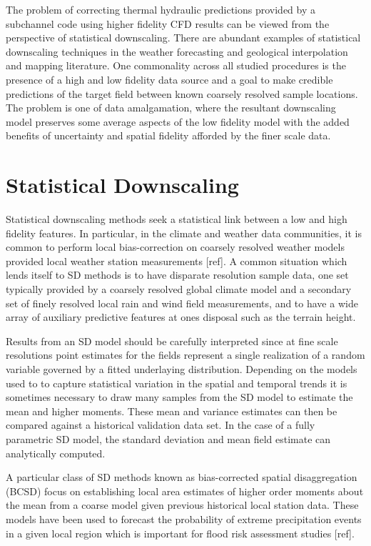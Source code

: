 
The problem of correcting thermal hydraulic predictions provided by a subchannel code using higher fidelity CFD results can be viewed from the perspective of statistical downscaling.  There are abundant examples of statistical downscaling techniques in the weather forecasting and geological interpolation and mapping literature.  One commonality across all studied procedures is the presence of a high and low fidelity data source and a goal to make credible predictions of the target field between known coarsely resolved sample locations.  The problem is one of data amalgamation, where the resultant downscaling model preserves some average aspects of the low fidelity model with the added benefits of uncertainty and spatial fidelity afforded by the finer scale data.

\section{Statistical Downscaling}

Statistical downscaling methods seek a statistical link between a low and high fidelity features. 
In particular, in the climate and weather data communities, it is common to perform local bias-correction on coarsely resolved weather models provided local weather station measurements [ref].    A common situation which lends itself to SD methods is to have disparate resolution sample data, one set typically provided by a coarsely resolved global climate model and a secondary set of finely resolved local rain and wind field measurements, and to have a wide array of auxiliary predictive features at ones disposal such as the terrain height.

Results from an SD model should be carefully interpreted since at fine scale resolutions point estimates for the fields represent a single realization of a random variable governed by a fitted underlaying distribution.  Depending on the models used to to capture statistical variation in the spatial and temporal trends it is sometimes necessary to draw many samples from the SD model to estimate the mean and higher moments.  These mean and variance estimates can then be compared against a historical validation data set.  In the case of a fully parametric SD model, the standard deviation and mean field estimate can analytically computed.

A particular class of SD methods known as bias-corrected spatial disaggregation (BCSD) focus on establishing local area estimates of higher order moments about the mean from a coarse model given previous historical local station data.  These models have been used to forecast the probability of extreme precipitation events in a given local region which is important for flood risk assessment studies [ref].

